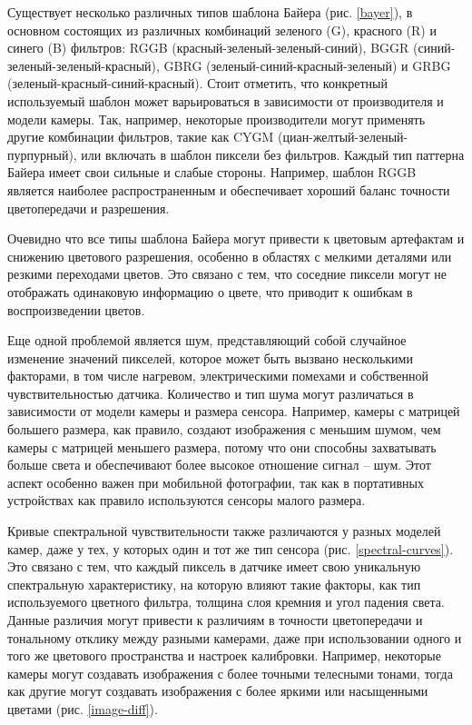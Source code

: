 Существует несколько различных типов шаблона Байера (рис. \ref{bayer}), в основном состоящих из различных комбинаций зеленого (G), красного (R) и синего (B) фильтров: RGGB (красный-зеленый-зеленый-синий), BGGR (синий-зеленый-зеленый-красный), GBRG (зеленый-синий-красный-зеленый) и GRBG (зеленый-красный-синий-красный). Стоит отметить, что конкретный используемый шаблон может варьироваться в зависимости от производителя и модели камеры. Так, например, некоторые производители могут применять другие комбинации фильтров, такие как CYGM (циан-желтый-зеленый-пурпурный), или включать в шаблон пиксели без фильтров. Каждый тип паттерна Байера имеет свои сильные и слабые стороны. Например, шаблон RGGB является наиболее распространенным и обеспечивает хороший баланс точности цветопередачи и разрешения.

Очевидно что все типы шаблона Байера могут привести к цветовым артефактам и снижению цветового разрешения, особенно в областях с мелкими деталями или резкими переходами цветов. Это связано с тем, что соседние пиксели могут не отображать одинаковую информацию о цвете, что приводит к ошибкам в воспроизведении цветов.

Еще одной проблемой является шум, представляющий собой случайное изменение значений пикселей, которое может быть вызвано несколькими факторами, в том числе нагревом, электрическими помехами и собственной чувствительностью датчика. Количество и тип шума могут различаться в зависимости от модели камеры и размера сенсора. Например, камеры с матрицей большего размера, как правило, создают изображения с меньшим шумом, чем камеры с матрицей меньшего размера, потому что они способны захватывать больше света и обеспечивают более высокое отношение сигнал -- шум. Этот аспект особенно важен при мобильной фотографии, так как в портативных устройствах как правило используются сенсоры малого размера.

Кривые спектральной чувствительности также различаются у разных моделей камер, даже у тех, у которых один и тот же тип сенсора (рис. \ref{spectral-curves}). Это связано с тем, что каждый пиксель в датчике имеет свою уникальную спектральную характеристику, на которую влияют такие факторы, как тип используемого цветного фильтра, толщина слоя кремния и угол падения света. Данные различия могут привести к различиям в точности цветопередачи и тональному отклику между разными камерами, даже при использовании одного и того же цветового пространства и настроек калибровки. Например, некоторые камеры могут создавать изображения с более точными телесными тонами, тогда как другие могут создавать изображения с более яркими или насыщенными цветами (рис. \ref{image-diff}).

